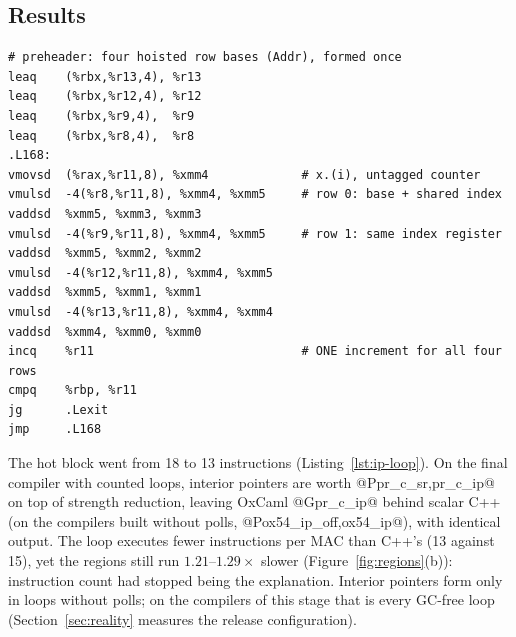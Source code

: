 \subsection{Results}
\begin{lstlisting}[language=asmX,caption={Inner loop with strength reduction and interior pointers (no polls): 13 instructions per 4 MACs. The final compiler with counted loops emits the same loop with polls on.},label=lst:ip-loop]
# preheader: four hoisted row bases (Addr), formed once
leaq    (%rbx,%r13,4), %r13
leaq    (%rbx,%r12,4), %r12
leaq    (%rbx,%r9,4),  %r9
leaq    (%rbx,%r8,4),  %r8
.L168:
vmovsd  (%rax,%r11,8), %xmm4             # x.(i), untagged counter
vmulsd  -4(%r8,%r11,8), %xmm4, %xmm5     # row 0: base + shared index
vaddsd  %xmm5, %xmm3, %xmm3
vmulsd  -4(%r9,%r11,8), %xmm4, %xmm5     # row 1: same index register
vaddsd  %xmm5, %xmm2, %xmm2
vmulsd  -4(%r12,%r11,8), %xmm4, %xmm5
vaddsd  %xmm5, %xmm1, %xmm1
vmulsd  -4(%r13,%r11,8), %xmm4, %xmm4
vaddsd  %xmm4, %xmm0, %xmm0
incq    %r11                             # ONE increment for all four rows
cmpq    %rbp, %r11
jg      .Lexit
jmp     .L168
\end{lstlisting}

The hot block went from 18 to 13 instructions (Listing~\ref{lst:ip-loop}).
On the final compiler with counted loops, interior pointers are worth
@P{pr_c_sr,pr_c_ip}@ on top of strength reduction, leaving OxCaml
@G{pr_c_ip}@ behind scalar C++ (on the compilers built without polls,
@P{ox54_ip_off,ox54_ip}@), with identical output. The loop
executes fewer instructions per MAC than C++'s (13 against 15), yet the
 regions still run $1.21$--$1.29\times$ slower
(Figure~\ref{fig:regions}(b)): instruction count had stopped being the
explanation. Interior pointers form only in loops without polls; on the
compilers of this stage that is every GC-free loop (Section~\ref{sec:reality}
measures the release configuration).
